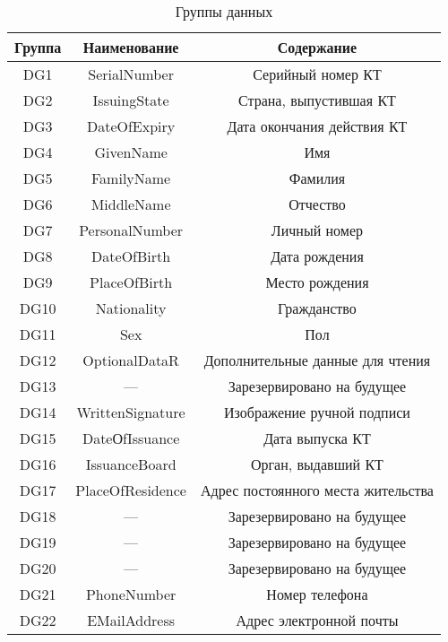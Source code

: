 \begin{table}[h!]
\caption{Группы данных}\label{Table.DATA.DG}
\begin{tabular}{|c|c|c|}
\hline
Группа & Наименование & Содержание \\
\hline
\hline
DG1 &	SerialNumber &	Серийный номер КТ    \\
\hline
DG2 &	IssuingState &	Страна, выпустившая КТ \\
\hline
DG3 &	DateOfExpiry &	Дата окончания действия КТ  \\
\hline
DG4 &	GivenName   &	Имя  \\
\hline
DG5 &	FamilyName &	Фамилия \\
\hline
DG6 &	MiddleName &	Отчество \\
\hline
DG7 &	PersonalNumber & Личный номер \\
\hline
DG8 &	DateOfBirth &	Дата рождения \\
\hline
DG9 &	PlaceOfBirth &	Место рождения \\
\hline
DG10 & 	Nationality &	Гражданство \\
\hline
DG11 &	Sex 	  &  Пол \\
\hline
DG12 &	OptionalDataR & Дополнительные данные для чтения \\
\hline
DG13 &	--- &   Зарезервировано на будущее \\
\hline
DG14 &  WrittenSignature & Изображение ручной подписи \\
\hline
DG15 &  DateОfIssuance & Дата выпуска КТ \\
\hline
DG16 &  IssuanceBoard & Орган, выдавший КТ \\
\hline
DG17 &	PlaceOfResidence &	Адрес постоянного места жительства \\
\hline
DG18 &	--- &   Зарезервировано на будущее \\
\hline
DG19 &	--- &	Зарезервировано на будущее  \\
\hline
DG20 &	--- & 	Зарезервировано на будущее \\
\hline
DG21 &	PhoneNumber & Номер телефона\\
\hline
DG22 &	EMailAddress & Адрес электронной почты \\
\hline
\end{tabular}
\end{table}
                         
